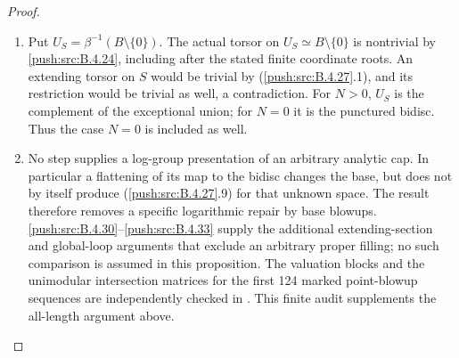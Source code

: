 \begin{proof}
\begin{enumerate}[label=\arabic*.,leftmargin=*]
\item Put $U_S=\beta^{-1}(B\setminus\{0\})$.
The actual torsor on $U_S\simeq B\setminus\{0\}$
is nontrivial by \ref{push:src:B.4.24}, including after the
stated finite coordinate roots. An extending
torsor on $S$ would be trivial by (\ref{push:src:B.4.27}.1),
and its restriction would be trivial as well,
a contradiction. For $N>0$, $U_S$ is the
complement of the exceptional union; for
$N=0$ it is the punctured bidisc. Thus the
case $N=0$ is included as well.

\item No step supplies a log-group presentation of
an arbitrary analytic cap. In particular a
flattening of its map to the bidisc changes
the base, but does not by itself produce
(\ref{push:src:B.4.27}.9) for that unknown space. The result
therefore removes a specific logarithmic
repair by base blowups. \ref{push:src:B.4.30}--\ref{push:src:B.4.33} supply the
additional extending-section and global-loop arguments
that exclude an arbitrary proper filling; no such
comparison is assumed in this proposition.
The valuation blocks and the unimodular
intersection matrices for the first 124 marked
point-blowup sequences are independently checked
in . This finite
audit supplements the all-length argument above.
\end{enumerate}
\end{proof}

